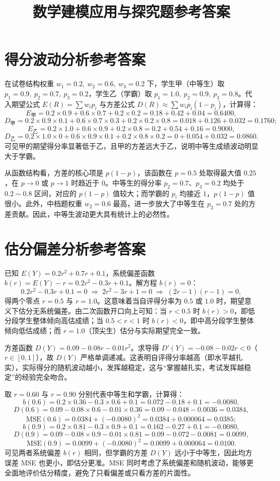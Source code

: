 \documentclass[10pt]{article}
\title{数学建模应用与探究题参考答案}
\author{}
\date{}
\begin{document}
\maketitle

\section{得分波动分析参考答案}

在试卷结构权重 $w_1=0.2,\ w_2=0.6,\ w_3=0.2$ 下，学生甲（中等生）取 $p_1=0.9,\ p_2=0.7,\ p_3=0.2$，学生乙（学霸）取 $p_1=1.0,\ p_2=0.9,\ p_3=0.8$。代入期望公式 $E(R)=\sum w_i p_i$ 与方差公式 $D(R)\approx\sum w_i p_i(1-p_i)$，计算得：
$$
E_{\text{甲}}=0.2\times0.9+0.6\times0.7+0.2\times0.2=0.18+0.42+0.04=0.6400,
$$
$$
D_{\text{甲}}=0.2\times0.9\times0.1+0.6\times0.7\times0.3+0.2\times0.2\times0.8=0.018+0.126+0.032=0.1760;
$$
$$
E_{\text{乙}}=0.2\times1.0+0.6\times0.9+0.2\times0.8=0.2+0.54+0.16=0.9000,
$$
$$
D_{\text{乙}}=0.2\times1.0\times0+0.6\times0.9\times0.1+0.2\times0.8\times0.2=0+0.054+0.032=0.0860.
$$
可见甲的期望得分率显著低于乙，且甲的方差远大于乙，说明中等生成绩波动明显大于学霸。

从函数结构看，方差的核心项是 $p(1-p)$，该函数在 $p=0.5$ 处取得最大值 $0.25$，在 $p\to0$ 或 $p\to1$ 时趋近于 $0$。中等生的得分率 $p_2=0.7$、$p_3=0.2$ 均处于 $0.2\sim0.8$ 区间，对应的 $p(1-p)$ 值较大；而学霸的 $p_i$ 均接近 $1$，$p(1-p)$ 值很小。此外，中档题权重 $w_2=0.6$ 最高，进一步放大了中等生在 $p_2=0.7$ 处的方差贡献。因此，中等生波动更大具有统计上的必然性。

\section{估分偏差分析参考答案}

已知 $E(Y)=0.2r^2+0.7r+0.1$，系统偏差函数 $b(r)=E(Y)-r=0.2r^2-0.3r+0.1$。解方程 $b(r)=0$：
$$
0.2r^2-0.3r+0.1=0 \;\Longrightarrow\; 2r^2-3r+1=0 \;\Longrightarrow\; (2r-1)(r-1)=0,
$$
得两个零点 $r=0.5$ 与 $r=1.0$。这意味着当自评得分率为 $0.5$ 或 $1.0$ 时，期望意义下估分无系统偏差。由二次函数开口向上可知：当 $r<0.5$ 时 $b(r)>0$，即低分段学生整体倾向高估成绩；当 $0.5<r<1$ 时 $b(r)<0$，即中高分段学生整体倾向低估成绩；而 $r=1.0$（顶尖生）估分与实际期望完全一致。

方差函数 $D(Y)=0.09-0.08r-0.01r^2$。求导得 $D'(Y)=-0.08-0.02r<0$（$r\in[0,1]$），故 $D(Y)$ 严格单调递减。这表明自评得分率越高（即水平越扎实），实际得分的随机波动越小，发挥越稳定，这与“掌握越扎实，考试发挥越稳定”的经验完全吻合。

取 $r=0.60$ 与 $r=0.90$ 分别代表中等生和学霸，计算得：
$$
b(0.6)=0.2\times0.36-0.3\times0.6+0.1=0.072-0.18+0.1=-0.0080,
$$
$$
D(0.6)=0.09-0.08\times0.6-0.01\times0.36=0.09-0.048-0.0036=0.0384,
$$
$$
\text{MSE}(0.6)=0.0384+(-0.0080)^2=0.0384+0.000064=0.0385;
$$
$$
b(0.9)=0.2\times0.81-0.3\times0.9+0.1=0.162-0.27+0.1=-0.0080,
$$
$$
D(0.9)=0.09-0.08\times0.9-0.01\times0.81=0.09-0.072-0.0081=0.0099,
$$
$$
\text{MSE}(0.9)=0.0099+(-0.0080)^2=0.0099+0.000064=0.0100.
$$
可见两者系统偏差 $b(r)$ 相同，但学霸的方差 $D(Y)$ 远小于中等生，因此均方误差 MSE 也更小，即估分更准。MSE 同时考虑了系统偏差和随机波动，能够更全面地评价估分精度，避免了只看偏差或只看方差的片面性。
\end{document}
